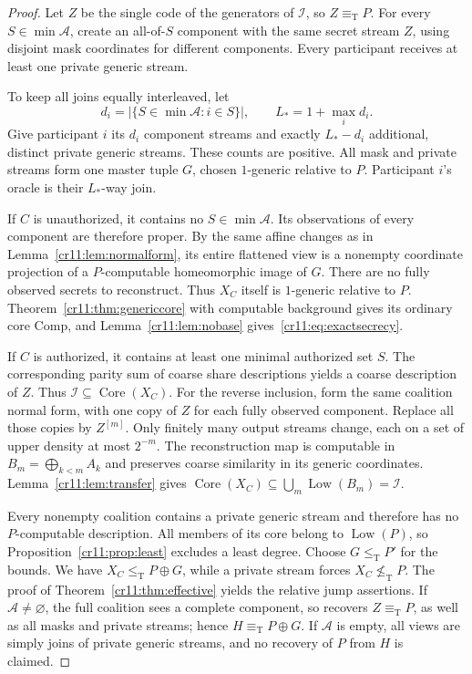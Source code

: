 \documentclass[11pt,letterpaper]{article}
\theoremstyle{plain}
\theoremstyle{definition}
\theoremstyle{remark}
\numberwithin{equation}{section}
\newcommand{\leT}{\leq_{\mathrm T}}
\newcommand{\eqT}{\equiv_{\mathrm T}}
\newcommand{\nleT}{\nleq_{\mathrm T}}
\newcommand{\Core}{\operatorname{Core}}
\newcommand{\Low}{\operatorname{Low}}
\newcommand{\Comp}{\mathrm{Comp}}
\newcommand{\join}{\mathbin{\oplus}}
\newcommand{\I}{\mathcal I}
\newcommand{\Acal}{\mathcal A}
\begin{document}
\begin{proof}
Let $Z$ be the single code of the generators of $\I$, so $Z\eqT P$.
For every $S\in\min\Acal$, create an all-of-$S$ component with the same
secret stream $Z$, using disjoint mask coordinates for different components.
Every participant receives at least one private generic stream.

To keep all joins equally interleaved, let
\[
 d_i=|\{S\in\min\Acal:i\in S\}|,\qquad
 L_*=1+\max_i d_i.
\]
Give participant $i$ its $d_i$ component streams and exactly $L_*-d_i$
additional, distinct private generic streams. These counts are positive.
All mask and private streams form one master tuple $G$, chosen $1$-generic
relative to $P$. Participant $i$'s oracle is their $L_*$-way join.

If $C$ is unauthorized, it contains no $S\in\min\Acal$. Its observations
of every component are therefore proper. By the same affine changes as in
Lemma~\ref{cr11:lem:normalform}, its entire flattened view is a nonempty
coordinate projection of a $P$-computable homeomorphic image of $G$.
There are no fully observed secrets to reconstruct. Thus $X_C$ itself is
$1$-generic relative to $P$. Theorem~\ref{cr11:thm:genericcore} with computable
background gives its ordinary core $\Comp$, and
Lemma~\ref{cr11:lem:nobase} gives~\eqref{cr11:eq:exactsecrecy}.

If $C$ is authorized, it contains at least one minimal authorized set $S$.
The corresponding parity sum of coarse share descriptions yields a coarse
description of $Z$. Thus $\I\subseteq\Core(X_C)$. For the reverse
inclusion, form the same coalition normal form, with one copy of $Z$ for
each fully observed component. Replace all those copies by $Z^{[m]}$.
Only finitely many output streams change, each on a set of upper density at
most $2^{-m}$. The reconstruction map is computable in
$B_m=\bigoplus_{k<m}A_k$ and preserves coarse similarity in its generic
coordinates. Lemma~\ref{cr11:lem:transfer} gives
$\Core(X_C)\subseteq\bigcup_m\Low(B_m)=\I$.

Every nonempty coalition contains a private generic stream and therefore
has no $P$-computable description. All members of its core belong to
$\Low(P)$, so Proposition~\ref{cr11:prop:least} excludes a least degree.
Choose $G\leT P'$ for the bounds. We have $X_C\leT P\join G$, while a
private stream forces $X_C\nleT P$. The proof of
Theorem~\ref{cr11:thm:effective} yields the relative jump assertions.
If $\Acal\ne\varnothing$, the full coalition sees a complete component,
so recovers $Z\eqT P$, as well as all masks and private streams; hence
$H\eqT P\join G$. If $\Acal$ is empty, all views are simply joins of
private generic streams, and no recovery of $P$ from $H$ is claimed.
\end{proof}
\end{document}

